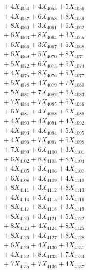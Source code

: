 \documentclass[a4paper,10pt]{article}
\begin{document}
{\begin{align}
&\;  + 4 X_{4054} + 4 X_{4055} + 5 X_{4056} \\[0.3ex]
&\;  + 4 X_{4057} + 6 X_{4058} + 8 X_{4059} \\[0.5ex]\allowbreak
&\;  + 8 X_{4060} + 3 X_{4061} + 6 X_{4062} \\[0.3ex]
&\;  + 6 X_{4063} + 8 X_{4064} + 3 X_{4065} \\[0.3ex]
&\;  + 6 X_{4066} + 3 X_{4067} + 5 X_{4068} \\[0.3ex]
&\;  + 6 X_{4069} + 5 X_{4070} + 8 X_{4071} \\[0.3ex]
&\;  + 5 X_{4072} + 6 X_{4073} + 6 X_{4074} \\[0.3ex]
&\;  + 4 X_{4075} + 8 X_{4076} + 5 X_{4077} \\[0.3ex]
&\;  + 5 X_{4078} + 4 X_{4079} + 7 X_{4080} \\[0.3ex]
&\;  + 5 X_{4081} + 7 X_{4082} + 6 X_{4083} \\[0.3ex]
&\;  + 7 X_{4084} + 7 X_{4085} + 6 X_{4086} \\[0.3ex]
&\;  + 6 X_{4087} + 4 X_{4088} + 6 X_{4089} \\[0.5ex]\allowbreak
&\;  + 4 X_{4090} + 4 X_{4091} + 4 X_{4092} \\[0.3ex]
&\;  + 4 X_{4093} + 4 X_{4094} + 5 X_{4095} \\[0.3ex]
&\;  + 4 X_{4096} + 7 X_{4097} + 6 X_{4098} \\[0.3ex]
&\;  + 7 X_{4099} + 6 X_{4100} + 3 X_{4101} \\[0.3ex]
&\;  + 6 X_{4102} + 8 X_{4103} + 8 X_{4104} \\[0.3ex]
&\;  + 4 X_{4105} + 3 X_{4106} + 4 X_{4107} \\[0.3ex]
&\;  + 6 X_{4108} + 4 X_{4109} + 4 X_{4110} \\[0.3ex]
&\;  + 8 X_{4111} + 3 X_{4112} + 8 X_{4113} \\[0.3ex]
&\;  + 4 X_{4114} + 5 X_{4115} + 5 X_{4116} \\[0.3ex]
&\;  + 8 X_{4117} + 8 X_{4118} + 3 X_{4119} \\[0.5ex]\allowbreak
&\;  + 8 X_{4120} + 3 X_{4121} + 5 X_{4122} \\[0.3ex]
&\;  + 8 X_{4123} + 4 X_{4124} + 8 X_{4125} \\[0.3ex]
&\;  + 8 X_{4126} + 4 X_{4127} + 8 X_{4128} \\[0.3ex]
&\;  + 6 X_{4129} + 4 X_{4130} + 3 X_{4131} \\[0.3ex]
&\;  + 4 X_{4132} + 8 X_{4133} + 7 X_{4134} \\[0.3ex]
&\;  + 7 X_{4135} + 7 X_{4136} + 4 X_{4137} \\[0.3ex]

\end{align}}
\end{document}
